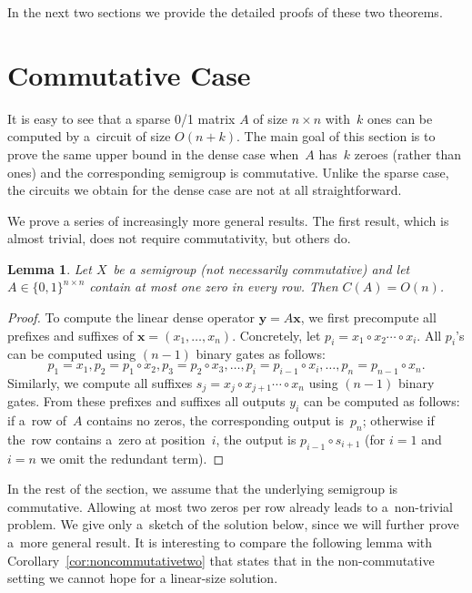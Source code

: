 \documentclass[11pt,letterpaper]{article}
\newtheorem{lemma}{Lemma}
\begin{document}
In the next two sections we provide the detailed proofs of these two theorems.

\section{Commutative Case}\label{sec-commutative}
It is easy to see that a sparse 0/1 matrix $A$ of size $n \times n$ with~$k$
ones can be computed by a~circuit of size $O(n+k)$. The main goal of this
section is to prove the same upper bound in the dense case when~$A$ has~$k$
zeroes (rather than ones) and the corresponding semigroup is commutative. Unlike
the sparse case, the circuits we obtain for the dense case are not at all
straightforward.

We prove a series of increasingly more general results. The first result, which
is almost trivial, does not require commutativity, but others do.


\begin{lemma}\label{lemma:easy}
Let $X$~be a semigroup (not necessarily commutative) and let
$A \in \{0,1\}^{n \times n}$ contain at most one zero in every row. Then
$C(A) = O(n)$.
\end{lemma}
\begin{proof}
To compute the linear dense operator $\mathbf{y} = A \mathbf{x}$, we first
precompute all prefixes and suffixes of $\mathbf{x}=(x_1, \dotsc, x_n)$.
Concretely, let $p_i=x_1 \circ x_2 \dotsb \circ x_i$. All $p_i$'s can be computed
using $(n-1)$ binary gates as follows:
\[
p_1=x_1, p_2=p_1 \circ x_2, p_3=p_2 \circ x_3, \dotsc, p_i=p_{i-1} \circ x_i, \dotsc, p_n=p_{n-1}\circ x_n.
\]
Similarly, we compute all suffixes $s_j=x_j \circ x_{j+1} \dotsb \circ x_n$ using
$(n-1)$ binary gates. From these prefixes and suffixes all outputs $y_i$ can be
computed as follows: if a~row of~$A$ contains no zeros, the corresponding
output is~$p_n$; otherwise if the~row contains a~zero at position~$i$, the
output is $p_{i-1} \circ s_{i+1}$ (for $i=1$ and $i=n$ we omit the redundant
term).
\end{proof}

In the rest of the section, we assume that the underlying semigroup is
commutative. Allowing at most two zeros per row already leads to a~non-trivial
problem. We give only a~sketch of the solution below, since we will further
prove a~more general result. It is interesting to compare the following lemma
with Corollary~\ref{cor:noncommutativetwo} that states that in the
non-commutative setting we cannot hope for a linear-size solution.
\end{document}
